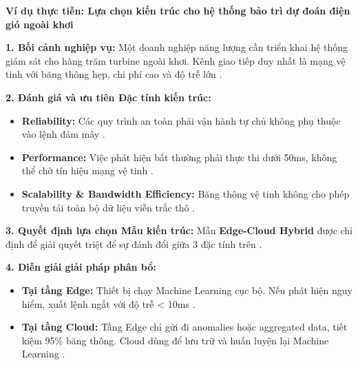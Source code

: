 \vspace{1em}
\noindent\textbf{Ví dụ thực tiễn: Lựa chọn kiến trúc cho hệ thống bảo trì dự đoán điện gió ngoài khơi}

\textbf{1. Bối cảnh nghiệp vụ:} 
Một doanh nghiệp năng lượng cần triển khai hệ thống giám sát cho hàng trăm turbine ngoài khơi. Kênh giao tiếp duy nhất là mạng vệ tinh với băng thông hẹp, chi phí cao và độ trễ lớn \cite{ms_rollsroyce}.

\textbf{2. Đánh giá và ưu tiên Đặc tính kiến trúc:}
\begin{itemize}
    \item \textbf{Reliability:} Các quy trình an toàn phải vận hành tự chủ không phụ thuộc vào lệnh đám mây \cite{lea2018}.
    \item \textbf{Performance:} Việc phát hiện bất thường phải thực thi dưới 50ms, không thể chờ tín hiệu mạng vệ tinh \cite{lea2018}.
    \item \textbf{Scalability \& Bandwidth Efficiency:} Băng thông vệ tinh không cho phép truyền tải toàn bộ dữ liệu viễn trắc thô \cite{ms_rollsroyce}.
\end{itemize}

\textbf{3. Quyết định lựa chọn Mẫu kiến trúc:}
Mẫu \textbf{Edge-Cloud Hybrid} được chỉ định để giải quyết triệt để sự đánh đổi giữa 3 đặc tính trên \cite{lea2018}.

\textbf{4. Diễn giải giải pháp phân bổ:}
\begin{itemize}
    \item \textbf{Tại tầng Edge:} Thiết bị chạy Machine Learning cục bộ. Nếu phát hiện nguy hiểm, xuất lệnh ngắt với độ trễ < 10ms  \cite{lea2018}.
    \item \textbf{Tại tầng Cloud:} Tầng Edge chỉ gửi đi anomalies hoặc aggregated data, tiết kiệm 95\% băng thông. Cloud dùng để lưu trữ và huấn luyện lại Machine Learning  \cite{lea2018}.
\end{itemize}